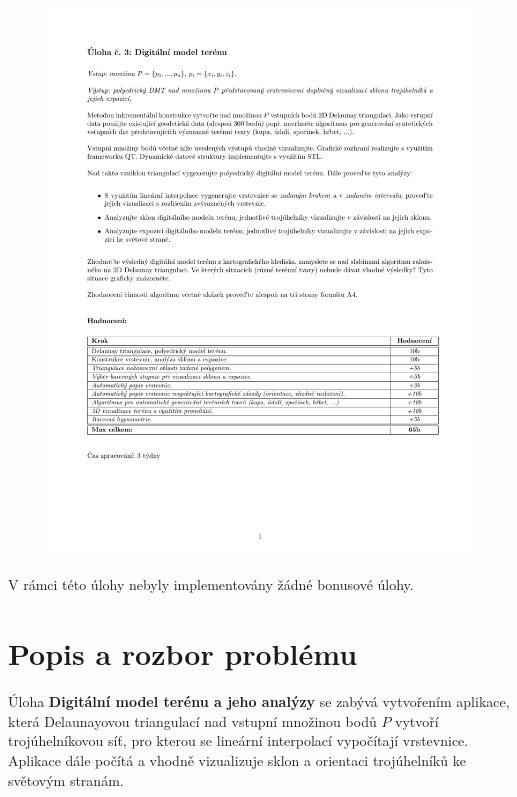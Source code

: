 \documentclass[a4paper, 12pt]{article}
\begin{document}
\begin{figure}[h!]
	\includegraphics[clip, trim=0cm 4.5cm 0cm 3cm, width=1.0\textwidth]{./pictures/zadani03.pdf}
\end{figure}

V rámci této úlohy nebyly implementovány žádné bonusové úlohy.
\clearpage

\section{Popis a rozbor problému}
Úloha \textbf{Digitální model terénu a jeho analýzy} se zabývá vytvořením aplikace, která Delaunayovou triangulací nad vstupní množinou bodů $P$ vytvoří trojúhelníkovou síť, pro kterou se lineární interpolací vypočítají vrstevnice. Aplikace dále počítá a vhodně vizualizuje sklon a orientaci trojúhelníků ke světovým stranám.\\ 
\end{document}
